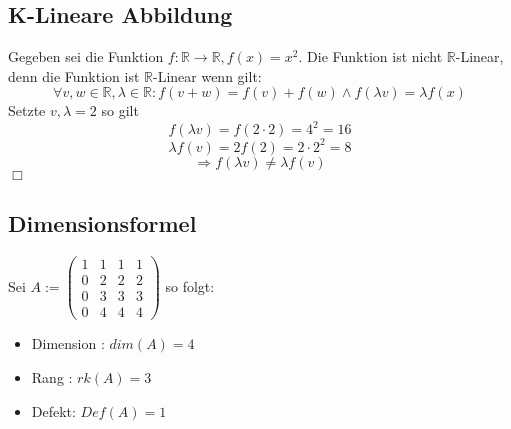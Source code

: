 \documentclass[12pt]{article}
\begin{document}
    \subsection{K-Lineare Abbildung}


    Gegeben sei die Funktion $f:\mathbb{R} \rightarrow \mathbb{R}, f(x) = x^2$. \newline
    \newline
    Die Funktion ist nicht $\mathbb{R}$-Linear, denn \newline
    die Funktion ist $\mathbb{R}$-Linear wenn gilt:
    \[\forall v,w\in \mathbb{R}, \lambda \in \mathbb{R} : f(v+w) = f(v) + f(w) \wedge f(\lambda v) = \lambda f(x)\]
    Setzte $v,\lambda=2$ so gilt \newline
    \[f(\lambda v) = f(2\cdot2)=4^2=16\]
    \[\lambda f(v) = 2 f(2)=2\cdot 2^2=8\]
    \[\Rightarrow f(\lambda v) \neq \lambda f(v)\]
    \hfill $\Box$

    \subsection{Dimensionsformel}

    Sei $A:=\begin{pmatrix}
                1& 1& 1& 1\\0& 2& 2& 2\\0& 3& 3& 3\\0& 4& 4& 4
    \end{pmatrix}$ so folgt: \newline


    \begin{itemize}
        \item Dimension : $dim(A) = 4$
        \item Rang : $rk(A) = 3$
        \item Defekt: $Def(A) = 1$
    \end{itemize}


    
\end{document}
